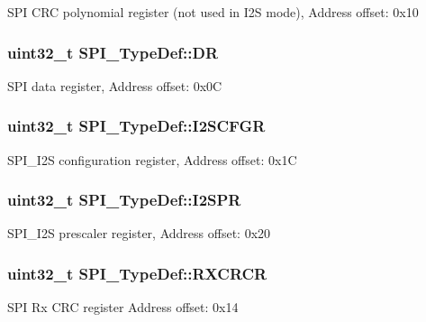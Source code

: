 S\-P\-I C\-R\-C polynomial register (not used in I2\-S mode), Address offset\-: 0x10 \hypertarget{struct_s_p_i___type_def_a02ef206dd5bb270e1f17fedd71284422}{
\subsubsection[{D\-R}]{ uint32\-\_\-t S\-P\-I\-\_\-\-Type\-Def\-::\-D\-R}}\label{struct_s_p_i___type_def_a02ef206dd5bb270e1f17fedd71284422}
S\-P\-I data register, Address offset\-: 0x0\-C \hypertarget{struct_s_p_i___type_def_a4a1547c0ed26f31108910c35d2876b83}{
\subsubsection[{I2\-S\-C\-F\-G\-R}]{ uint32\-\_\-t S\-P\-I\-\_\-\-Type\-Def\-::\-I2\-S\-C\-F\-G\-R}}\label{struct_s_p_i___type_def_a4a1547c0ed26f31108910c35d2876b83}
S\-P\-I\-\_\-\-I2\-S configuration register, Address offset\-: 0x1\-C \hypertarget{struct_s_p_i___type_def_aff2f386a2566c722f7962377b495f1a2}{
\subsubsection[{I2\-S\-P\-R}]{ uint32\-\_\-t S\-P\-I\-\_\-\-Type\-Def\-::\-I2\-S\-P\-R}}\label{struct_s_p_i___type_def_aff2f386a2566c722f7962377b495f1a2}
S\-P\-I\-\_\-\-I2\-S prescaler register, Address offset\-: 0x20 \hypertarget{struct_s_p_i___type_def_a60f1f0e77c52e89cfd738999bee5c9d0}{
\subsubsection[{R\-X\-C\-R\-C\-R}]{ uint32\-\_\-t S\-P\-I\-\_\-\-Type\-Def\-::\-R\-X\-C\-R\-C\-R}}\label{struct_s_p_i___type_def_a60f1f0e77c52e89cfd738999bee5c9d0}
S\-P\-I Rx C\-R\-C register Address offset\-: 0x14

